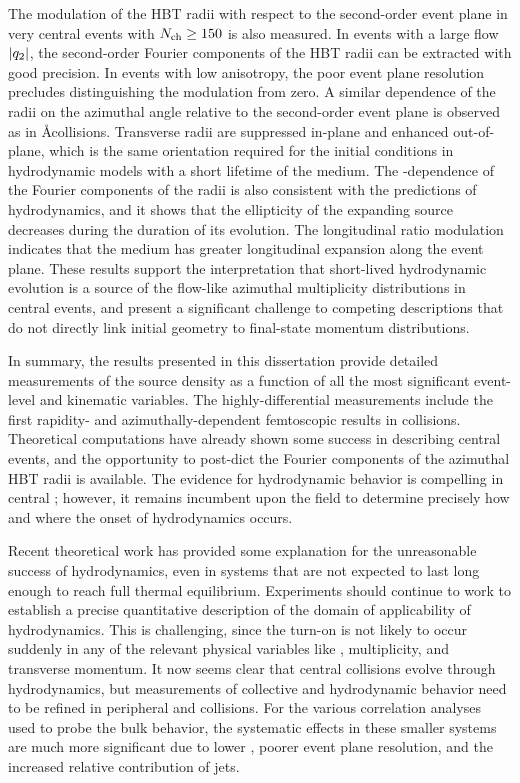 The modulation of the HBT radii with respect to the second-order event plane in very central \pPb events with $\mbox{$N_{\mathrm{ch}}$} \geq 150$ is also measured.
In events with a large flow $|q_{2}|$, the second-order Fourier components of the HBT radii can be extracted with good precision.
In events with low anisotropy, the poor event plane resolution precludes distinguishing the modulation from zero.
A similar dependence of the radii on the azimuthal angle relative to the second-order event plane is observed as in \AA collisions.
Transverse radii are suppressed in-plane and enhanced out-of-plane, which is the same orientation required for the initial conditions in hydrodynamic models with a short lifetime of the medium.
The \kt-dependence of the Fourier components of the radii is also consistent with the predictions of hydrodynamics, and it shows that the ellipticity of the expanding source decreases during the duration of its evolution.
The longitudinal ratio \Rlong modulation indicates that the medium has greater longitudinal expansion along the event plane.
These results support the interpretation that short-lived hydrodynamic evolution is a source of the flow-like azimuthal multiplicity distributions in central \pPb events, and present a significant challenge to competing descriptions that do not directly link initial geometry to final-state momentum distributions.

In summary, the results presented in this dissertation provide detailed measurements of the \pPb source density as a function of all the most significant event-level and kinematic variables.
The highly-differential measurements include the first rapidity- and azimuthally-dependent femtoscopic results in \pA collisions.
Theoretical computations have already shown some success in describing central \pPb events, and the opportunity to post-dict the Fourier components of the azimuthal HBT radii is available.
The evidence for hydrodynamic behavior is compelling in central \pPb; however, it remains incumbent upon the field to determine precisely how and where the onset of hydrodynamics occurs.

Recent theoretical work has provided some explanation for the unreasonable success of hydrodynamics, even in systems that are not expected to last long enough to reach full thermal equilibrium.
Experiments should continue to work to establish a precise quantitative description of the domain of applicability of hydrodynamics.
This is challenging, since the turn-on is not likely to occur suddenly in any of the relevant physical variables like \Npart, multiplicity, and transverse momentum.
It now seems clear that central \pPb collisions evolve through hydrodynamics, but measurements of collective and hydrodynamic behavior need to be refined in peripheral \pPb and \pp collisions.
For the various correlation analyses used to probe the bulk behavior, the systematic effects in these smaller systems are much more significant due to lower \Nch, poorer event plane resolution, and the increased relative contribution of jets.

